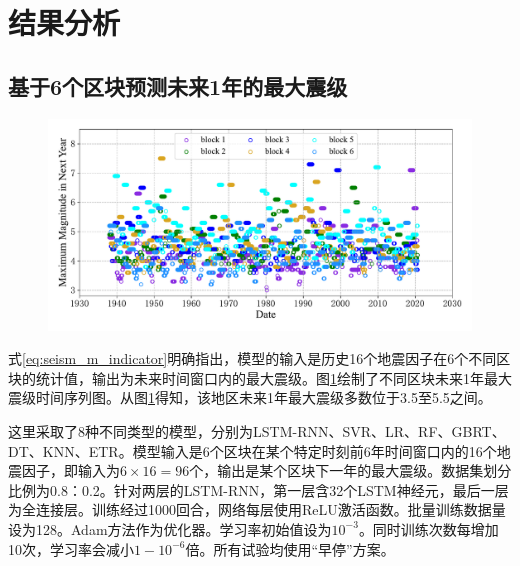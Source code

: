 \section{结果分析}\label{sec:seism_result}

\subsection{基于6个区块预测未来1年的最大震级}\label{sec:seism_result_6}

\begin{figure}[!htbp]
  \centering
  \includegraphics[width=\textwidth]{Img/chap5_seism/seism_magnitude_index_1932_2021.pdf}
  \vspace{-1cm}
  \label{fig:seism_magnitude_index_1932_2021}
\end{figure}

式\ref{eq:seism_m_indicator}明确指出，模型的输入是历史16个地震因子在6个不同区块的统计值，输出为未来时间窗口内的最大震级。图\ref{fig:seism_magnitude_index_1932_2021}绘制了不同区块未来1年最大震级时间序列图。从图\ref{fig:seism_magnitude_index_1932_2021}得知，该地区未来1年最大震级多数位于3.5至5.5之间。

这里采取了8种不同类型的模型，分别为LSTM-RNN、SVR、LR、RF、GBRT、DT、KNN、ETR。模型输入是6个区块在某个特定时刻前6年时间窗口内的16个地震因子，即输入为$6\times 16=96$个，输出是某个区块下一年的最大震级。数据集划分比例为0.8：0.2。针对两层的LSTM-RNN，第一层含32个LSTM神经元，最后一层为全连接层。训练经过1000回合，网络每层使用ReLU激活函数。批量训练数据量设为128。Adam方法作为优化器。学习率初始值设为$10^{-3}$。同时训练次数每增加10次，学习率会减小$1-10^{-6}$倍。所有试验均使用“早停”方案。

